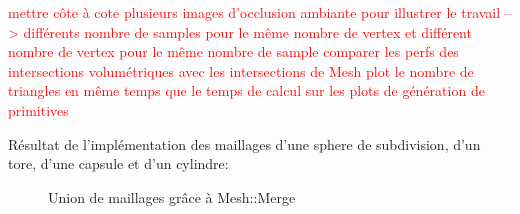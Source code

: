 \textcolor{red}{mettre côte à cote plusieurs images d'occlusion ambiante pour illustrer le travail --> différents nombre de samples pour le même nombre de vertex et différent nombre de vertex pour le même nombre de sample}
\textcolor{red}{comparer les perfs des intersections volumétriques avec les intersections de Mesh}
\textcolor{red}{plot le nombre de triangles en même temps que le temps de calcul sur les plots de génération de primitives}

Résultat de l'implémentation des maillages d'une sphere de subdivision, d'un tore, d'une capsule et d'un cylindre:

\begin{figure}[h!]

	\caption{Union de maillages grâce à Mesh::Merge}
\end{figure}
\FloatBarrier
